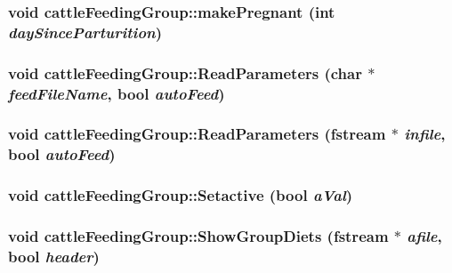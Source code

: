\hypertarget{classcattle_feeding_group_a9b47f29ee4cfa7b3827537f14eaadfb4}{
\subsubsection[{makePregnant}]{\setlength{\rightskip}{0pt plus 5cm}void cattleFeedingGroup::makePregnant (int {\em daySinceParturition})}}
\label{classcattle_feeding_group_a9b47f29ee4cfa7b3827537f14eaadfb4}
\hypertarget{classcattle_feeding_group_ae4b1101582a0d6cbb8246b1c01eb415b}{
\subsubsection[{ReadParameters}]{\setlength{\rightskip}{0pt plus 5cm}void cattleFeedingGroup::ReadParameters (char $\ast$ {\em feedFileName}, \/  bool {\em autoFeed})}}
\label{classcattle_feeding_group_ae4b1101582a0d6cbb8246b1c01eb415b}
\hypertarget{classcattle_feeding_group_a58423d35bf42c9277a67eadbe8cadad0}{
\subsubsection[{ReadParameters}]{\setlength{\rightskip}{0pt plus 5cm}void cattleFeedingGroup::ReadParameters (fstream $\ast$ {\em infile}, \/  bool {\em autoFeed})}}
\label{classcattle_feeding_group_a58423d35bf42c9277a67eadbe8cadad0}
\hypertarget{classcattle_feeding_group_ae5b02aeeb62dede88726515fe5868695}{
\subsubsection[{Setactive}]{\setlength{\rightskip}{0pt plus 5cm}void cattleFeedingGroup::Setactive (bool {\em aVal})}}
\label{classcattle_feeding_group_ae5b02aeeb62dede88726515fe5868695}
\hypertarget{classcattle_feeding_group_a7f878fe86db6f4ff6939ae336e073fe4}{
\subsubsection[{ShowGroupDiets}]{\setlength{\rightskip}{0pt plus 5cm}void cattleFeedingGroup::ShowGroupDiets (fstream $\ast$ {\em afile}, \/  bool {\em header})}}
\label{classcattle_feeding_group_a7f878fe86db6f4ff6939ae336e073fe4}


